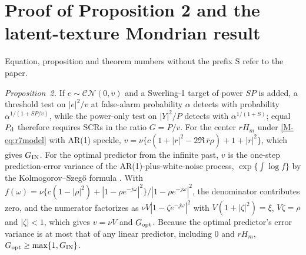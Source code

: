 \documentclass[10pt]{article}
\begin{document}
\section{Proof of Proposition 2 and the latent-texture Mondrian result}
Equation, proposition and theorem numbers without the prefix S refer to the paper.

\emph{Proposition~2.} If $e\sim\mathcal{CN}(0,v)$ and a Swerling-1 target of power $SP$ is added, a threshold test on $|e|^2/v$ at false-alarm probability $\alpha$ detects with probability $\alpha^{1/(1+SP/v)}$, while the power-only test on $|Y|^2/P$ detects with $\alpha^{1/(1+S)}$; equal $P_{\rm d}$ therefore requires SCRs in the ratio $G=P/v$. For the center $rH_m$ under \eqref{M-eq:r7model} with AR(1) speckle, $v=\nu\{c(1+|r|^2-2\Re\,\bar r\rho)+1+|r|^2\}$, which gives $G_{\rm IN}$. For the optimal predictor from the infinite past, $v$ is the one-step prediction-error variance of the AR(1)-plus-white-noise process, $\exp\{\int\log f\}$ by the Kolmogorov--Szeg\H{o} formula \cite{S-brockwell1991}. With $f(\omega)=\nu\{c(1-|\rho|^2)+|1-\rho e^{-j\omega}|^2\}/|1-\rho e^{-j\omega}|^2$, the denominator contributes zero, and the numerator factorizes as $\nu V|1-\zeta e^{-j\omega}|^2$ with $V(1+|\zeta|^2)=\xi$, $V\zeta=\rho$ and $|\zeta|<1$, which gives $v=\nu V$ and $G_{\rm opt}$. Because the optimal predictor's error variance is at most that of any linear predictor, including $0$ and $rH_m$, $G_{\rm opt}\ge\max\{1,G_{\rm IN}\}$.
\end{document}
